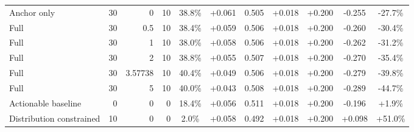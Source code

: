 \begin{table}[htbp]
\begin{tabular}{lrrrccccccc}
Anchor only & 30 & 0 & 10 & 38.8\% & +0.061 & 0.505 & +0.018 & +0.200 & -0.255 & -27.7\% \\
Full & 30 & 0.5 & 10 & 38.4\% & +0.059 & 0.506 & +0.018 & +0.200 & -0.260 & -30.4\% \\
Full & 30 & 1 & 10 & 38.0\% & +0.058 & 0.506 & +0.018 & +0.200 & -0.262 & -31.2\% \\
Full & 30 & 2 & 10 & 38.8\% & +0.055 & 0.507 & +0.018 & +0.200 & -0.270 & -35.4\% \\
Full & 30 & 3.57738 & 10 & 40.4\% & +0.049 & 0.506 & +0.018 & +0.200 & -0.279 & -39.8\% \\
Full & 30 & 5 & 10 & 40.0\% & +0.043 & 0.508 & +0.018 & +0.200 & -0.289 & -44.7\% \\
Actionable baseline & 0 & 0 & 0 & 18.4\% & +0.056 & 0.511 & +0.018 & +0.200 & -0.196 & +1.9\% \\
Distribution constrained & 10 & 0 & 0 & 2.0\% & +0.058 & 0.492 & +0.018 & +0.200 & +0.098 & +51.0\% \\
\bottomrule
\end{tabular}
\end{table}